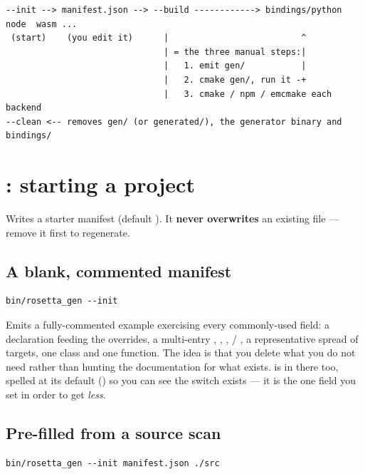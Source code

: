 \begin{lstlisting}[style=plain]
--init --> manifest.json --> --build ------------> bindings/python  node  wasm ...
 (start)    (you edit it)      |                          ^
                               | = the three manual steps:|
                               |   1. emit gen/           |
                               |   2. cmake gen/, run it -+
                               |   3. cmake / npm / emcmake each backend
--clean <-- removes gen/ (or generated/), the generator binary and bindings/
\end{lstlisting}

\section{: starting a project}
\label{sec:init}

Writes a starter manifest (default ). It \textbf{never
overwrites} an existing file --- remove it first to regenerate.

\subsection*{A blank, commented manifest}

\begin{lstlisting}[style=sh]
bin/rosetta_gen --init
\end{lstlisting}

Emits a fully-commented example exercising every commonly-used field: a
 declaration feeding the  overrides, a
multi-entry , ,
,  / , a
representative spread of targets, one class and one function. The idea is that
you delete what you do not need rather than hunting the documentation for what
exists.  is in there too, spelled at its default
() so you can see the switch exists --- it is the one field you set
in order to get \emph{less}.

\subsection*{Pre-filled from a source scan}

\begin{lstlisting}[style=sh]
bin/rosetta_gen --init manifest.json ./src
\end{lstlisting}

